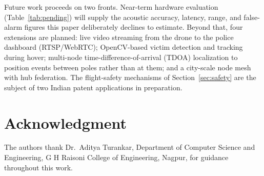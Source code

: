 \documentclass[journal]{IEEEtran}
\begin{document}
Future work proceeds on two fronts. Near-term hardware evaluation
(Table~\ref{tab:pending}) will supply the acoustic accuracy, latency, range,
and false-alarm figures this paper deliberately declines to estimate. Beyond
that, four extensions are planned: live video streaming from the drone to
the police dashboard (RTSP/WebRTC); OpenCV-based victim detection and
tracking during hover; multi-node time-difference-of-arrival (TDOA)
localization to position events between poles rather than at them; and a
city-scale node mesh with hub federation. The flight-safety mechanisms of
Section~\ref{sec:safety} are the subject of two Indian patent applications
in preparation.

\section*{Acknowledgment}

The authors thank Dr.~Aditya Turankar, Department of Computer Science and
Engineering, G H Raisoni College of Engineering, Nagpur, for guidance
throughout this work.
\end{document}
